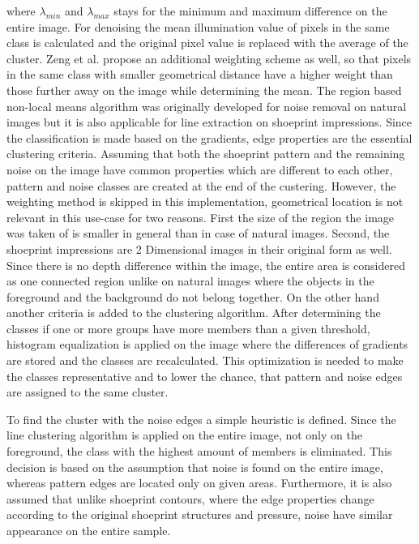 \documentclass[draft,final]{vutinfth} %
\begin{document}
where $\lambda_{min}$ and $\lambda_{max}$ stays for the minimum and maximum difference on the entire image.
For denoising the mean illumination value of pixels in the same class is calculated and the original pixel value is replaced with the average of the cluster.
Zeng et al. \cite{zeng2011region} propose an additional weighting scheme as well, so that pixels in the same class with smaller geometrical distance have a higher weight than those further away on the image while determining the mean.
The region based non-local means algorithm was originally developed for noise removal on natural images but it is also applicable for line extraction on shoeprint impressions.
Since the classification is made based on the gradients, edge properties are the essential clustering criteria.
Assuming that both the shoeprint pattern and the remaining noise on the image have common properties which are different to each other, pattern and noise classes are created at the end of the custering.
However, the weighting method is skipped in this implementation, geometrical location is not relevant in this use-case for two reasons.
First the size of the region the image was taken of is smaller in general than in case of natural images.
Second, the shoeprint impressions are 2 Dimensional images in their original form as well. 
Since there is no depth difference within the image, the entire area is considered as one connected region unlike on natural images where the objects in the foreground and the background do not belong together.
On the other hand another criteria is added to the clustering algorithm.
After determining the classes if one or more groups have more members than a given threshold, histogram equalization is applied on the image where the differences of gradients are stored and the classes are recalculated.
This optimization is needed to make the classes representative and to lower the chance, that pattern and noise edges are assigned to the same cluster. 
\par
To find  the cluster with the noise edges a simple heuristic is defined.
Since the line clustering algorithm is applied on the entire image, not only on the foreground, the class with the highest amount of members is eliminated.
This decision is based on the assumption that noise is found on the entire image, whereas pattern edges are located only on given areas.
Furthermore, it is also assumed that unlike shoeprint contours, where the edge properties change according to the original shoeprint structures and pressure, noise have similar appearance on the entire sample.
\end{document}
